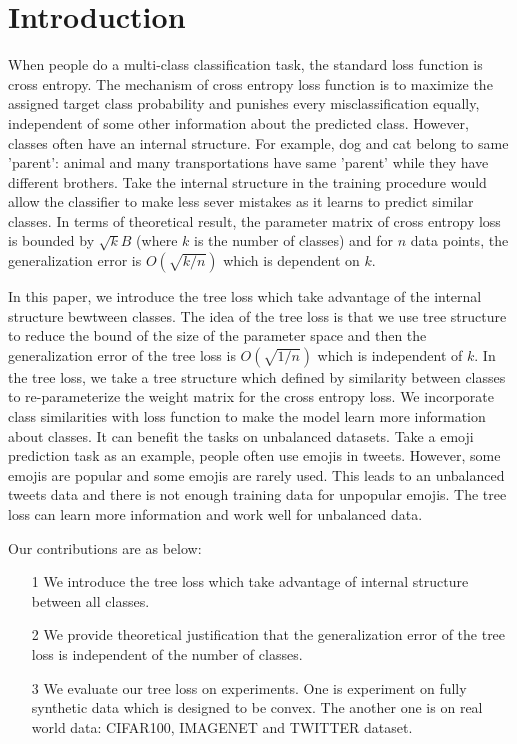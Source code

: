 \documentclass[twoside]{article}
\theoremstyle{definition}
\begin{document}
\section{Introduction}

When people do a multi-class classification task, the standard loss function is cross entropy.
The mechanism of cross entropy loss function is to maximize the assigned target class probability and punishes every misclassification equally, independent of some other information about the predicted class.
However, classes often have an internal structure. 
For example, dog and cat belong to same 'parent': animal and many transportations have same 'parent' while they have different brothers. Take the internal structure in the training procedure would allow the classifier to make less sever mistakes as it learns to predict similar classes.
In terms of theoretical result, the parameter matrix of cross entropy loss is bounded by $\sqrt{k}B$ (where $k$ is the number of classes) and for $n$ data points, the generalization error is $O(\sqrt{k/n})$ which is dependent on $k$.

In this paper, we introduce the tree loss which take advantage of the internal structure bewtween classes.
The idea of the tree loss is that we use tree structure to reduce the bound of the size of the parameter space and then the generalization error of the tree loss is $O(\sqrt{1/n})$ which is independent of $k$.
In the tree loss, we take a tree structure which defined by similarity between classes to re-parameterize the weight matrix for the cross entropy loss.
We incorporate class similarities with loss function to make the model learn more information about classes.
It can benefit the tasks on unbalanced datasets.
Take a emoji prediction task as an example, people often use emojis in tweets.
However, some emojis are popular and some emojis are rarely used.
This leads to an unbalanced tweets data and there is not enough training data for unpopular emojis.
The tree loss can learn more information and work well for unbalanced data.


Our contributions are as below:
\begin{itemize}
    \item [1] 
    We introduce the tree loss which take advantage of internal structure between all classes.
    \item [2] 
    We provide theoretical justification that the generalization error of the tree loss is independent of the number of classes.
    \item [3]
    We evaluate our tree loss on experiments. One is experiment on fully synthetic data which is designed to be convex. The another one is on real world data: CIFAR100, IMAGENET and TWITTER dataset. 
    
\end{itemize}
\end{document}
